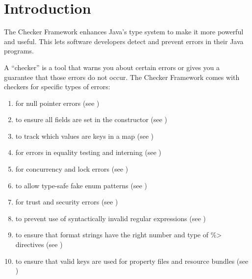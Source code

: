 \htmlhr
\chapter{Introduction\label{introduction}}

The Checker Framework enhances Java's type system to make it more powerful
and useful.
This lets software developers detect and
prevent errors in their Java programs.

A ``checker'' is a tool that warns you about certain errors or gives you a
guarantee that those errors do not occur.
The Checker Framework comes with checkers for specific types of errors:

\begin{enumerate}

\item
   for null pointer errors
  (see )
\item
   to ensure all
  fields are set in the constructor (see
  )
\item
   to track which values are
  keys in a map (see )
\item
   for errors in equality
  testing and interning (see )
\item
   for concurrency and lock errors
  (see )
\item
   to allow type-safe fake enum
  patterns (see )
\item
   for trust and security errors
  (see )
\item
   to prevent use of syntactically
  invalid regular expressions (see )
\item
   to ensure that format
  strings have the right number and type of \<\%> directives (see
  )
\item
   to ensure that valid
  keys are used for property files and resource bundles (see
  )

\end{enumerate}
